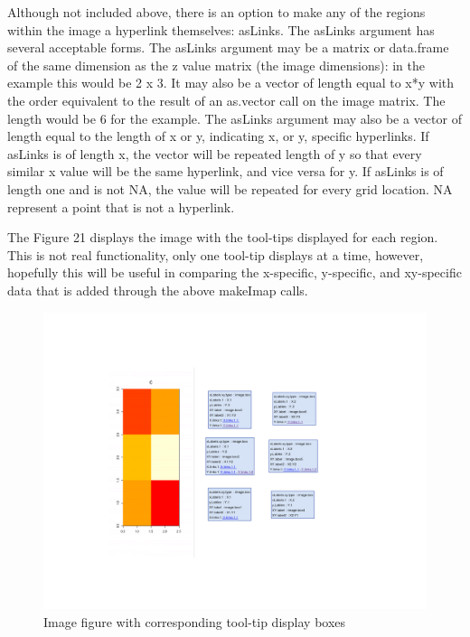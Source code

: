 \documentclass[]{article}
\begin{document}
Although not included above, there is an option to make any of the regions within the image a hyperlink themselves: asLinks. The asLinks argument has several acceptable forms. The asLinks argument may be a matrix or data.frame of the same dimension as the z value matrix (the image dimensions): in the example this would be 2 x 3. It may also be a vector of length equal to x*y with the order equivalent to the result of an as.vector call on the image matrix. The length would be 6 for the example. The asLinks argument may also be a vector of length equal to the length of x or y, indicating x, or y, specific hyperlinks. If asLinks is of length x, the vector will be repeated length of y so that every similar x value will be the same hyperlink, and vice versa for y. If asLinks is of length one and is not NA, the value will be repeated for every grid location. NA represent a point that is not a hyperlink. \newline

\indent The Figure 21 displays the image with the tool-tips displayed for each region. This is not real functionality, only one tool-tip displays at a time, however, hopefully this will be useful in comparing the x-specific, y-specific, and xy-specific data that is added through the above makeImap calls.

\begin{center}
\begin{figure}
\includegraphics{imageToolTip}
\caption{Image figure with corresponding tool-tip display boxes}
\end{figure}
\end{center}
\end{document}
